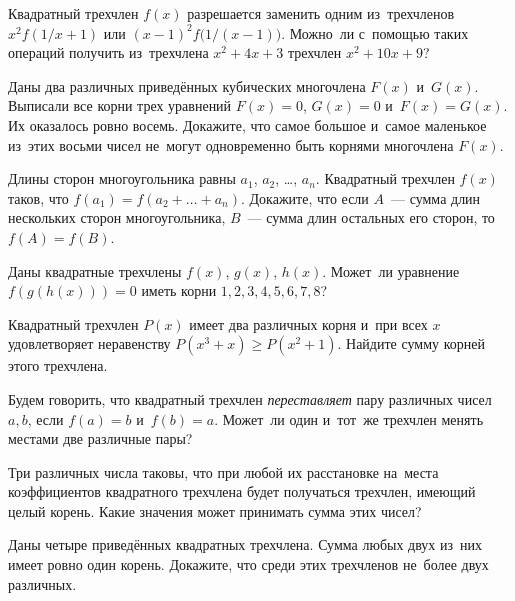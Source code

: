 


\begin{problems}

\item
Квадратный трехчлен $f(x)$ разрешается заменить одним из~трехчленов
$x^2 f(1 / x + 1)$ или $(x - 1)^2 f\bigl(1 / (x-1)\bigr)$.
Можно~ли с~помощью таких операций получить из~трехчлена $x^2 + 4 x + 3$
трехчлен $x^2 + 10 x + 9$?

\item
Даны два различных приведённых кубических многочлена $F(x)$ и~$G(x)$.
Выписали все корни трех уравнений $F(x) = 0$, $G(x) = 0$ и~$F(x) = G(x)$.
Их оказалось ровно восемь.
Докажите, что самое большое и~самое маленькое из~этих восьми чисел не~могут
одновременно быть корнями многочлена $F(x)$.

\item
Длины сторон многоугольника равны $a_{1}$, $a_{2}$, \ldots, $a_{n}$.
Квадратный трехчлен $f(x)$ таков, что $f(a_{1}) = f(a_{2} + \ldots + a_{n})$.
Докажите, что если $A$~--- сумма длин нескольких сторон многоугольника,
$B$~--- сумма длин остальных его сторон, то~$f(A) = f(B)$.

\item
Даны квадратные трехчлены $f(x)$, $g(x)$, $h(x)$.
Может~ли уравнение $f(g(h(x))) = 0$ иметь корни $1, 2, 3, 4, 5, 6, 7, 8$?

\item
Квадратный трехчлен $P(x)$ имеет два различных корня и~при всех $x$
удовлетворяет неравенству $P(x^3 + x) \geq P(x^2 + 1)$.
Найдите сумму корней этого трехчлена.

\item
Будем говорить, что квадратный трехчлен \emph{переставляет} пару различных
чисел $a, b$, если $f(a) = b$ и~$f(b) = a$.
Может~ли один и~тот~же трехчлен менять местами две различные пары?

\item
Три различных числа таковы, что при любой их расстановке на~места коэффициентов
квадратного трехчлена будет получаться трехчлен, имеющий целый корень.
Какие значения может принимать сумма этих чисел?

\item
Даны четыре приведённых квадратных трехчлена.
Сумма любых двух из~них имеет ровно один корень.
Докажите, что среди этих трехчленов не~более двух различных.


\end{problems}
